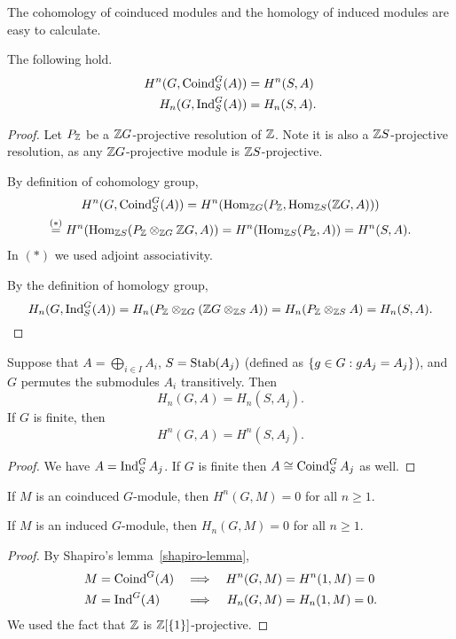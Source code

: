 The cohomology of coinduced modules and the homology of induced modules are easy to calculate.
\begin{lem}
The following hold.
\begin{align*}
H^n(G,\operatorname{Coind}_S^G(A))&=H^n(S,A)\\
H_n(G,\operatorname{Ind}_S^G(A))&=H_n(S,A).
\end{align*}
\end{lem}
\begin{proof}
Let $P_{\mathbb{Z}}$ be a $\mathbb{Z} G$-projective resolution of $\mathbb{Z}$. Note it is also a $\mathbb{Z} S$-projective resolution, as any $\mathbb{Z} G$-projective module is $\mathbb{Z} S$-projective. 

By definition of cohomology group,
\begin{multline*}
H^n(G,\operatorname{Coind}_S^G(A))=H^n(\operatorname{Hom}_{\mathbb{Z} G}(P_{\mathbb{Z}},\operatorname{Hom}_{\mathbb{Z} S} (\mathbb{Z} G,A)))\\
\stackrel{(*)}{=} H^n(\operatorname{Hom}_{\mathbb{Z} S}(P_{\mathbb{Z}}\otimes_{\mathbb{Z} G} \mathbb{Z} G,A))=H^n(\operatorname{Hom}_{\mathbb{Z} S}(P_{\mathbb{Z}},A))=H^n(S, A).
\end{multline*}
In $(*)$ we used adjoint associativity.

By the definition of homology group,
\[
H_n(G,\operatorname{Ind}_S^G(A))=H_n(P_{\mathbb{Z}}\otimes_{\mathbb{Z} G} (\mathbb{Z} G\otimes_{\mathbb{Z} S} A))
=H_n(P_{\mathbb{Z}}\otimes_{\mathbb{Z} S}A)=H_n(S,A).\qedhere
\]
\end{proof}
\begin{cor}
Suppose that $A=\bigoplus_{i\in I}A_i$, $S=\operatorname{Stab}(A_j)$ (defined as $\left\{{g\in G}:{gA_j=A_j}\right\}$), and $G$ permutes the submodules $A_i$ transitively. Then
\[
H_n(G,A)=H_n(S,A_j).
\]
If $G$ is finite, then
\[
H^n(G,A)=H^n(S,A_j).
\]
\end{cor}
\begin{proof}
We have $A=\operatorname{Ind}_{S}^G A_j$. If $G$ is finite then $A\cong \operatorname{Coind}_S^G A_j$ as well.
\end{proof}
\begin{cor}
If $M$ is an coinduced $G$-module, then $H^n(G,M)=0$ for all $n\ge 1$.

If $M$ is an induced $G$-module, then $H_n(G,M)=0$ for all $n\ge 1$.
\end{cor}
\begin{proof}
By Shapiro's lemma~\ref{shapiro-lemma},
\begin{align*}
M&=\operatorname{Coind}^G(A)&\implies&& H^n(G,M)&=H^n(1,M)=0\\
M&=\operatorname{Ind}^G(A)&\implies&& H_n(G,M)&=H_n(1,M)=0.
\end{align*}
We used the fact that $\mathbb{Z}$ is $\mathbb{Z}[\{1\}]$-projective.
\end{proof}
